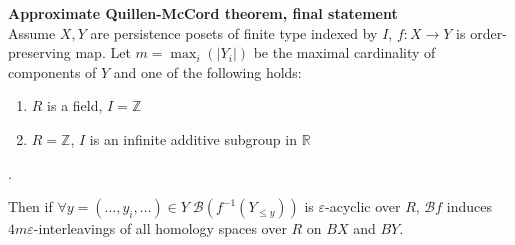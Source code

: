 \begin{theorem} \textbf{Approximate Quillen-McCord theorem, final statement}\\
  Assume $X, Y$ are persistence posets of finite type indexed by $I$, $f : X \to Y$ is order-preserving map. Let $m = \max_{i}(|Y_i|)$ be the maximal cardinality of components of $Y$ and one of the following holds:\\
  \begin{enumerate}
    \item $R$ is a field, $I = \mathbb{Z}$
    \item $R = \mathbb{Z}$, $I$ is an infinite additive subgroup in $\mathbb{R}$
  \end{enumerate}.

  Then if $\forall y=(\ldots,y_i,\ldots) \in Y\;\mathcal{B}(f^{-1}(Y_{\leqslant y}))$ is $\varepsilon$-acyclic over $R$, $\mathcal{B}f$ induces $4m\varepsilon$-interleavings of all homology spaces over $R$ on $BX$ and $BY$.\\
\end{theorem}

